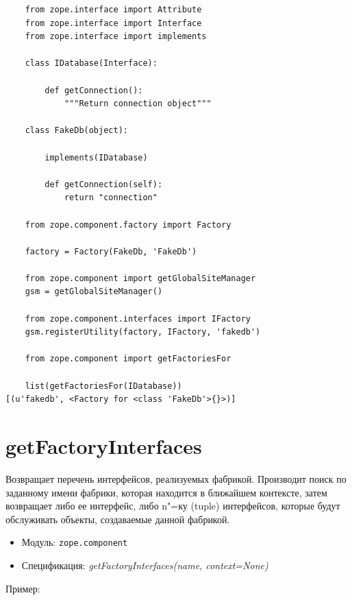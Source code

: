 \documentclass[a4paper,openany,twoside,draft]{book}
\providecommand*{\DUroletitlereference}[1]{\textsl{#1}}
\begin{document}
\begin{verbatim}
    from zope.interface import Attribute
    from zope.interface import Interface
    from zope.interface import implements

    class IDatabase(Interface):

        def getConnection():
            """Return connection object"""

    class FakeDb(object):

        implements(IDatabase)

        def getConnection(self):
            return "connection"

    from zope.component.factory import Factory

    factory = Factory(FakeDb, 'FakeDb')

    from zope.component import getGlobalSiteManager
    gsm = getGlobalSiteManager()

    from zope.component.interfaces import IFactory
    gsm.registerUtility(factory, IFactory, 'fakedb')

    from zope.component import getFactoriesFor

    list(getFactoriesFor(IDatabase))
[(u'fakedb', <Factory for <class 'FakeDb'>{}>)]
\end{verbatim}


\section*{getFactoryInterfaces%
  \label{getfactoryinterfaces}%
}

Возвращает перечень интерфейсов, реализуемых фабрикой.  Производит поиск по заданному имени фабрики, которая находится в ближайшем контексте, затем возвращает либо ее интерфейс, либо n"=ку (tuple) интерфейсов, которые будут обслуживать объекты, создаваемые данной фабрикой.

\begin{itemize}

\item Модуль: \texttt{zope.component}

\item Спецификация: \DUroletitlereference{getFactoryInterfaces(name, context=None)}

\end{itemize}

Пример:
\end{document}
